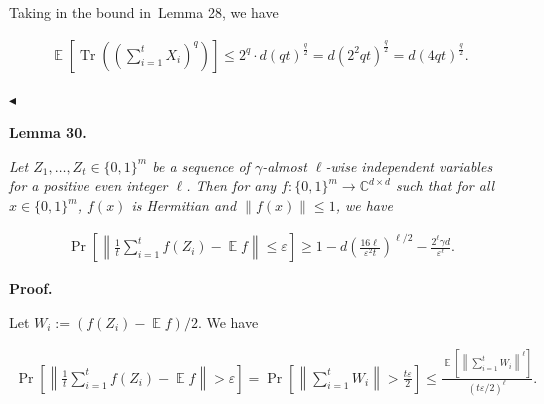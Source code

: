 Taking in the bound in Lemma 28, we have\par


\[\begin{gathered}
\operatorname*{\mathbb{E}}\left[\operatorname*{Tr}\left(\left(\sum_{i=1}^{t}X_{i}\right)^{q}\right)\right]\leq 2^{q}\cdot d(qt)^{\frac{q}{2}}=d\left(2^{2}qt\right)^{\frac{q}{2}}=d\left(4qt\right)^{\frac{q}{2}}.\
\end{gathered}\]


$\blacktriangleleft$\par





\par\medskip\noindent\textbf{
\textbf{Lemma 30}\textbf{.}
}\par



\emph{Let $Z_{1},\dots,Z_{t}\in\{0,1\}^{m}$ be a sequence of $\gamma$-almost $\ell$-wise independent variables for a positive even integer $\ell$. Then for any $f:\{0,1\}^{m}\to\mathbb{C}^{d\times d}$ such that for all $x\in\{0,1\}^{m}$, $f(x)$ is Hermitian and $\|f(x)\|\leq 1$, we have}\par


\[\begin{gathered}
\Pr\left[\left\lVert\frac{1}{t}\sum_{i=1}^{t}f(Z_{i})-\operatorname*{\mathbb{E}}f\right\rVert\leq\varepsilon\right]\geq 1-d\left(\frac{16\ell}{\varepsilon^{2}t}\right)^{\ell/2}-\frac{2^{\ell}\gamma d}{\varepsilon^{\ell}}.
\end{gathered}\]







\par\medskip\noindent\textbf{Proof.}\par




Let $W_{i}:=(f(Z_{i})-\operatorname*{\mathbb{E}}f)/2$.
We have\par


\[\begin{gathered}
\displaystyle\Pr\left[\left\lVert\frac{1}{t}\sum_{i=1}^{t}f(Z_{i})-\operatorname*{\mathbb{E}}f\right\rVert>\varepsilon\right]=\Pr\left[\left\lVert\sum_{i=1}^{t}W_{i}\right\rVert>\frac{t\varepsilon}{2}\right]\leq\frac{\operatorname*{\mathbb{E}}\left[\left\lVert\sum_{i=1}^{t}W_{i}\right\rVert^{\ell}\right]}{(t\varepsilon/2)^{\ell}}.
\end{gathered}\]



